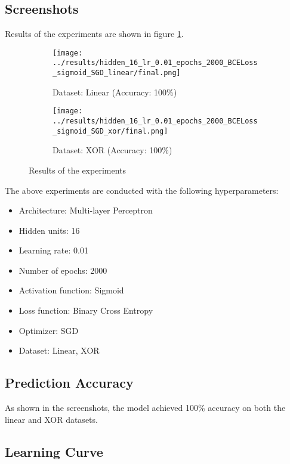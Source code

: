 \subsection{Screenshots}

Results of the experiments are shown in figure \ref{fig:results}.

\begin{figure}[H]
    \centering
    \begin{subfigure}{0.5\textwidth}
        \centering
        \texttt{[image: ../results/hidden\_16\_lr\_0.01\_epochs\_2000\_BCELoss\_sigmoid\_SGD\_linear/final.png]}
        \caption{Dataset: Linear (Accuracy: 100\%)}
    \end{subfigure}%
    \begin{subfigure}{0.5\textwidth}
        \centering
        \texttt{[image: ../results/hidden\_16\_lr\_0.01\_epochs\_2000\_BCELoss\_sigmoid\_SGD\_xor/final.png]}
        \caption{Dataset: XOR (Accuracy: 100\%)}
    \end{subfigure}
    \caption{Results of the experiments}
    \label{fig:results}
\end{figure}

The above experiments are conducted with the following hyperparameters:

\begin{itemize}
    \item Architecture: Multi-layer Perceptron
    \item Hidden units: 16
    \item Learning rate: 0.01
    \item Number of epochs: 2000
    \item Activation function: Sigmoid
    \item Loss function: Binary Cross Entropy
    \item Optimizer: SGD
    \item Dataset: Linear, XOR
\end{itemize}

\subsection{Prediction Accuracy}

As shown in the screenshots, the model achieved 100\% accuracy on both the linear and XOR datasets.

\subsection{Learning Curve}

